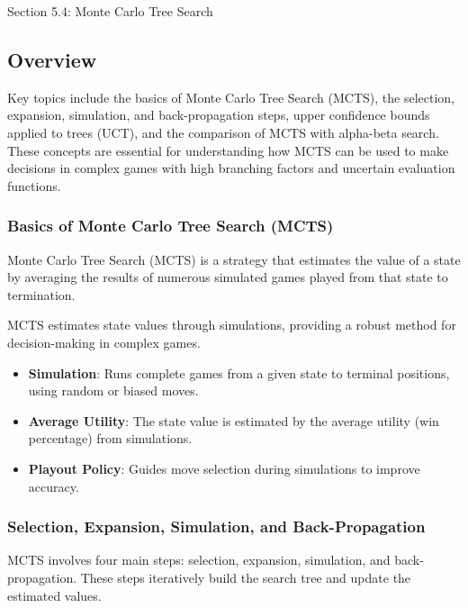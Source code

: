 \begin{notes}{Section 5.4: Monte Carlo Tree Search}
    \subsection*{Overview}

    Key topics include the basics of Monte Carlo Tree Search (MCTS), the selection, expansion, simulation, and back-propagation steps, upper confidence bounds applied to trees (UCT), and the comparison 
    of MCTS with alpha-beta search. These concepts are essential for understanding how MCTS can be used to make decisions in complex games with high branching factors and uncertain evaluation functions.
    
    \subsubsection*{Basics of Monte Carlo Tree Search (MCTS)}
    
    Monte Carlo Tree Search (MCTS) is a strategy that estimates the value of a state by averaging the results of numerous simulated games played from that state to termination.
    
    \begin{highlight}
        MCTS estimates state values through simulations, providing a robust method for decision-making in complex games.
        
        \begin{itemize}
            \item \textbf{Simulation}: Runs complete games from a given state to terminal positions, using random or biased moves.
            \item \textbf{Average Utility}: The state value is estimated by the average utility (win percentage) from simulations.
            \item \textbf{Playout Policy}: Guides move selection during simulations to improve accuracy.
        \end{itemize}
    \end{highlight}
    
    \subsubsection*{Selection, Expansion, Simulation, and Back-Propagation}
    
    MCTS involves four main steps: selection, expansion, simulation, and back-propagation. These steps iteratively build the search tree and update the estimated values.
    

\end{notes}
